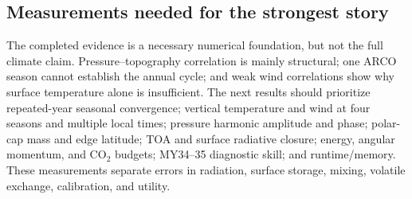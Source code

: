 \documentclass{article}
\begin{document}
\subsection{Measurements needed for the strongest story}
The completed evidence is a necessary numerical foundation, but not the full
climate claim. Pressure--topography correlation is mainly structural;
one ARCO season cannot establish the annual cycle; and weak wind correlations
show why surface temperature alone is insufficient. The next results should
prioritize repeated-year seasonal convergence; vertical temperature and wind at
four seasons and multiple local times; pressure harmonic amplitude and phase;
polar-cap mass and edge latitude; TOA and surface radiative closure; energy,
angular momentum, and \(\mathrm{CO_2}\) budgets; MY34--35 diagnostic skill; and
runtime/memory. These measurements separate errors in radiation, surface
storage, mixing, volatile exchange, calibration, and utility.
\end{document}
